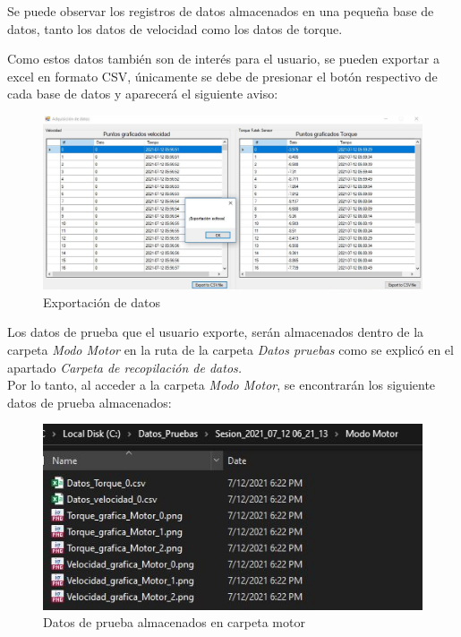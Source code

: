 \documentclass[12pt,titlepage]{article}
\begin{document}
Se puede observar los registros de datos almacenados en una pequeña base de datos, tanto los datos de velocidad como los datos de torque.

\newpage
 Como estos datos también son de interés para el usuario, se pueden exportar a excel en formato CSV, únicamente se debe de presionar el botón respectivo de cada base de datos y aparecerá el siguiente  aviso: 

\begin{figure}[htbp]
\hspace*{2.0cm} 
\includegraphics[scale=0.50]{export_data}
\caption{Exportación de datos}
\end{figure}

Los datos de prueba que el usuario exporte, serán almacenados dentro de la carpeta \textit{Modo Motor} en la ruta de la carpeta \textit{Datos pruebas} como se explicó en el apartado \textit{Carpeta de recopilación de datos.} \\ 

Por lo tanto, al acceder a la carpeta \textit{Modo Motor}, se encontrarán los siguiente datos de prueba almacenados: \\ 
\begin{figure}[htbp]
\hspace*{3.5cm} 
\includegraphics[scale=0.70]{datos_motor}
\caption{Datos de prueba almacenados en carpeta motor}
\end{figure}
\end{document}
